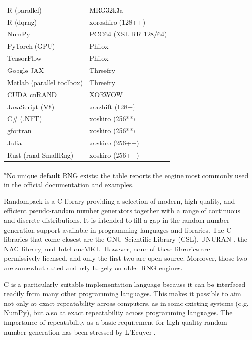 \documentclass[manuscript,screen,review]{acmart}
\begin{document}
\begin{table}
\begin{minipage}{0.52\columnwidth}
\begin{tabular}{l@{\hspace{2.5em}}l}
R (parallel)              & MRG32k3a \\
R (dqrng)                 & xoroshiro (128++) \\
NumPy                     & PCG64 (XSL-RR 128/64) \\
PyTorch (GPU)             & Philox \\
TensorFlow                & Philox \\
Google JAX                & Threefry \\
Matlab (parallel toolbox) & Threefry \\
CUDA cuRAND               & XORWOW \\
JavaScript (V8)           & xorshift (128+) \\
C\# (.NET)                & xoshiro (256**) \\
gfortran                  & xoshiro (256**) \\
Julia                     & xoshiro (256++) \\
Rust (rand SmallRng)      & xoshiro (256++) \\
\bottomrule
\end{tabular}
\par\medskip
\footnotesize
\raggedright
\textsuperscript{a}No unique default RNG exists; the table reports the
engine most commonly used in the official documentation and examples.
\end{minipage}
\end{table}

Randompack is a C library providing a selection of modern,
high-quality, and efficient pseudo-random number generators together
with a range of continuous and discrete distributions. It is intended
to fill a gap in the random-number-generation support available in
programming languages and libraries. The C libraries that come closest
are the GNU Scientific Library (GSL), UNURAN
\cite{hormann2000randomnumber}, the NAG library, and Intel oneMKL.
However, none of these libraries are permissively licensed, and only
the first two are open source. Moreover, those two are somewhat dated
and rely largely on older RNG engines.

C is a particularly suitable implementation language because it can be
interfaced readily from many other programming languages. This makes
it possible to aim not only at exact repeatability across computers,
as in some existing systems (e.g. NumPy), but also at exact
repeatability across programming languages. The importance of
repeatability as a basic requirement for high-quality random number
generation has been stressed by L’Ecuyer
\cite{lecuyer2015rng,lecuyer2017parallel}.
\end{document}
